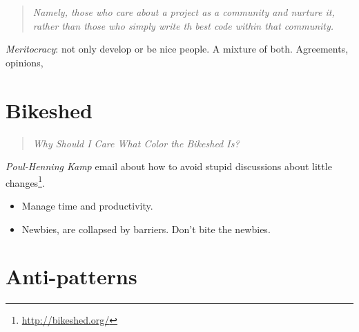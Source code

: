 \documentclass[11pt]{scrartcl}
\begin{document}
\begin{quote}
    \emph{Namely, those who care about a project as a community and nurture it, rather than those who simply write th best code within that community.}
\end{quote}

\emph{Meritocracy}: not only develop or be nice people. A mixture of both. Agreements, opinions, 

\section{Bikeshed}
\label{sec:bikeshed}

\begin{quote}
    \emph{Why Should I Care What Color the Bikeshed Is?}
\end{quote}

\emph{Poul-Henning Kamp} email about how to avoid stupid discussions about little changes\footnote{\url{http://bikeshed.org/}}.

\begin{itemize}
	\item Manage time and productivity.
	\item Newbies, are collapsed by barriers. Don't bite the newbies.
\end{itemize}


\section{Anti-patterns}
\label{sec:anti-patterns}



\end{document}
